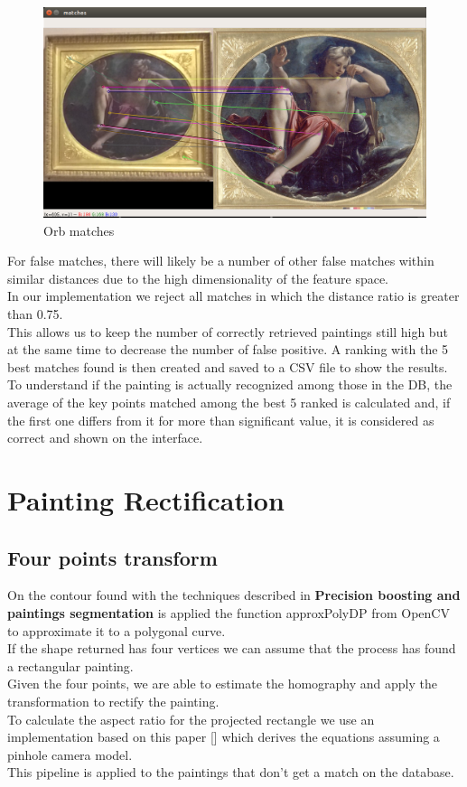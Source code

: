 \documentclass[conference]{IEEEtran}
\begin{document}
\begin{figure}[htbp]
\centerline{\includegraphics[width=0.8\columnwidth]{../Orb_matches/match3.png}}
\caption{Orb matches}
\label{fig_Orb_matches}
\end{figure}

For false matches, there will likely be a number of other false matches within similar distances due to the high dimensionality of the feature space.\\
In our implementation we reject all matches in which the distance ratio is greater than 0.75.\\
This allows us to keep the number of correctly retrieved paintings still high but at the same time to decrease the number of false positive.
A ranking with the 5 best matches found is then created and saved to a CSV file to show the results.\\
To understand if the painting is actually recognized among those in the DB, the average of the key points matched among the best 5 ranked is calculated and, if the first one differs from it for more than significant value, it is considered as correct and shown on the interface.


\section{Painting Rectification}
\subsection{Four points transform}
On the contour found with the techniques described in \textbf{Precision boosting and paintings segmentation} is applied the function approxPolyDP from OpenCV to approximate it to a polygonal curve.\\
If the shape returned has four vertices we can assume that the process has found a rectangular painting.\\
Given the four points, we are able to estimate the homography and apply the transformation to rectify the painting.\\
To calculate the aspect ratio for the projected rectangle we use an implementation based on this paper [] which derives the equations assuming a pinhole camera model.\\
This pipeline is applied to the paintings that don't get a match on the database.
\end{document}
